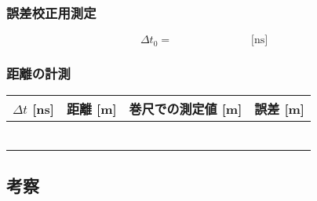 \newpage

\subjikken{}

\subsubsection*{誤差校正用測定}

\[
\Delta t_0 = \hspace{3cm}\text{[ns]}
\]

\subsubsection*{距離の計測}

\hspace*{-\parindent}
\begin{tabular}{|c|c|c|c|}
\hline
$\Delta t$ [ns] & 距離 [m] & 巻尺での測定値 [m] & 誤差 [m] \\
\hline\hline
\hspace*{3cm}&\hspace*{3cm}&\hspace*{3cm}&\hspace*{3cm}\\
\hline
&&&\\
\hline
&&&\\
\hline
&&&\\
\hline
&&&\\
\hline
&&&\\
\hline
\end{tabular}


\subsection*{考察}

